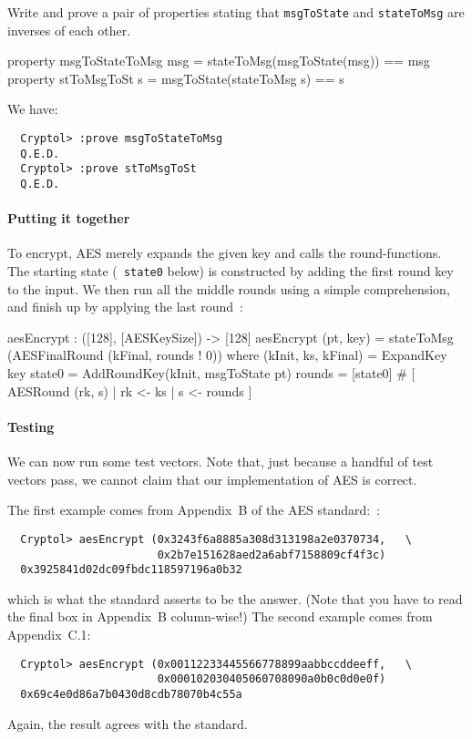 \begin{Exercise}\label{ex:aes:enc0}
  Write and prove a pair of properties stating that {\tt msgToState}
  and {\tt stateToMsg} are inverses of each other.
\end{Exercise}
\begin{Answer}
\begin{code}
  property msgToStateToMsg msg = stateToMsg(msgToState(msg)) == msg
  property stToMsgToSt s = msgToState(stateToMsg s) == s
\end{code}
We have:
\begin{Verbatim}
  Cryptol> :prove msgToStateToMsg
  Q.E.D.
  Cryptol> :prove stToMsgToSt
  Q.E.D.
\end{Verbatim}
\end{Answer}

\paragraph*{Putting it together} To encrypt, AES merely expands the
given key and calls the round-functions. The starting state ({\tt
  state0} below) is constructed by adding the first round key to the
input. We then run all the middle rounds using a simple comprehension,
and finish up by applying the last round~\cite[Figure 5, Section
5.1]{aes}:\indRIndex
\begin{code}
  aesEncrypt : ([128], [AESKeySize]) -> [128]
  aesEncrypt (pt, key) = stateToMsg (AESFinalRound (kFinal, rounds ! 0))
    where   (kInit, ks, kFinal) = ExpandKey key
            state0 = AddRoundKey(kInit, msgToState pt)
            rounds = [state0] # [ AESRound (rk, s) | rk <- ks
                                                   | s <- rounds
                                ]
\end{code}

\paragraph*{Testing} We can now run some test vectors. Note that, just
because a handful of test vectors pass, we cannot claim that our
implementation of AES is correct.  

The first example comes from Appendix~B of the AES\indAES
standard:~\cite{aes}:
\begin{Verbatim}
  Cryptol> aesEncrypt (0x3243f6a8885a308d313198a2e0370734,   \
                       0x2b7e151628aed2a6abf7158809cf4f3c)
  0x3925841d02dc09fbdc118597196a0b32
\end{Verbatim}
which is what the standard asserts to be the answer. (Note that you
have to read the final box in Appendix~B column-wise!)  The second
example comes from Appendix~C.1:
\begin{Verbatim}
  Cryptol> aesEncrypt (0x00112233445566778899aabbccddeeff,   \
                       0x000102030405060708090a0b0c0d0e0f)
  0x69c4e0d86a7b0430d8cdb78070b4c55a
\end{Verbatim}
Again, the result agrees with the standard.

